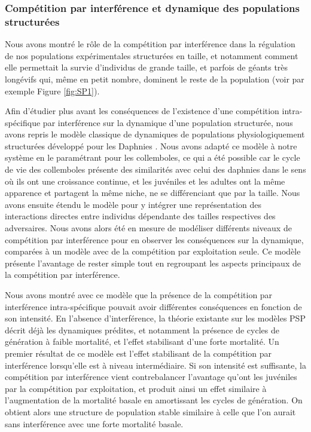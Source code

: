 \subsubsection{Compétition par interférence et dynamique des populations
structurées}

Nous avons montré le rôle de la compétition par interférence dans la régulation
de nos populations expérimentales structurées en taille, et notamment comment
elle permettait la survie d'individus de grande taille, et parfois de géants
très longévifs qui, même en petit nombre, dominent le reste de la population
(voir par exemple Figure \ref{fig:SP1}).

Afin d'étudier plus avant les conséquences de l'existence d'une compétition
intra-spécifique par interférence sur la dynamique d'une population structurée,
nous avons repris le modèle classique de dynamiques de populations
physiologiquement structurées développé pour les Daphnies
\autocites{kooijman1984a}. Nous avons adapté ce modèle à notre système en le
paramétrant pour les collemboles, ce qui a été possible car le cycle de vie des
collemboles présente des similarités avec celui des daphnies dans le sens où ils
ont une croissance continue, et les juvéniles et les adultes ont la même
apparence et partagent la même niche, ne se différenciant que par la taille.
Nous avons ensuite étendu le modèle pour y intégrer une représentation des
interactions directes entre individus dépendante des tailles respectives des
adversaires. Nous avons alors été en mesure de modéliser différents niveaux de
compétition par interférence pour en observer les conséquences sur la dynamique,
comparées à un modèle avec de la compétition par exploitation seule. Ce modèle
présente l'avantage de rester simple tout en regroupant les aspects principaux
de la compétition par interférence.

Nous avons montré avec ce modèle que la présence de la compétition par
interférence intra-spécifique pouvait avoir différentes conséquences en fonction
de son intensité. En l'absence d'interférence, la théorie existante sur les
modèles PSP décrit déjà les dynamiques prédites, et notamment la présence de
cycles de génération à faible mortalité, et l'effet stabilisant d'une forte
mortalité. Un premier résultat de ce modèle est l'effet stabilisant de la
compétition par interférence lorsqu'elle est à niveau intermédiaire. Si son
intensité est suffisante, la compétition par interférence vient contrebalancer
l'avantage qu'ont les juvéniles par la compétition par exploitation, et produit
ainsi un effet similaire à l'augmentation de la mortalité basale en amortissant
les cycles de génération. On obtient alors une structure de population stable
similaire à celle que l'on aurait sans interférence avec une forte mortalité
basale.

